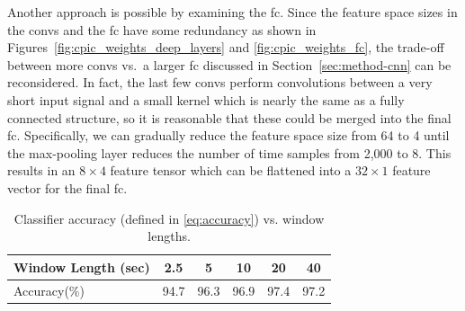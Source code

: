 \documentclass{article}
\begin{document}
Another approach is possible by examining the \gls{fc}.
Since the feature space sizes in the \glspl{conv} and the \gls{fc} have some redundancy as shown in Figures~\ref{fig:cpic_weights_deep_layers} and \ref{fig:cpic_weights_fc}, the trade-off between more \glspl{conv} vs.\ a larger \gls{fc} discussed in Section~\ref{sec:method-cnn} can be reconsidered.
In fact, the last few \glspl{conv} perform convolutions between a very short input signal and a small kernel which is nearly the same as a fully connected structure, so it is reasonable that these could be merged into the final \gls{fc}.
Specifically, we can gradually reduce the feature space size from 64 to 4 until the max-pooling layer reduces the number of time samples from 2,000 to 8.
This results in an $8\times 4$ feature tensor which can be flattened into a $32\times 1$ feature vector for the final \gls{fc}.
%
\begin{table}
    \centering
    \caption{Classifier accuracy (defined in \eqref{eq:accuracy}) vs.  window lengths.}
    \label{tab:window-length}
    \begin{tabular}{l c c c c c}
        \toprule
        Window Length (sec) & 2.5 & 5 & 10 & 20 & 40\\
        \midrule
        Accuracy(\%) & 94.7 & 96.3 & 96.9 & 97.4 & 97.2\\
        \bottomrule
    \end{tabular}
\end{table}
%
\end{document}
